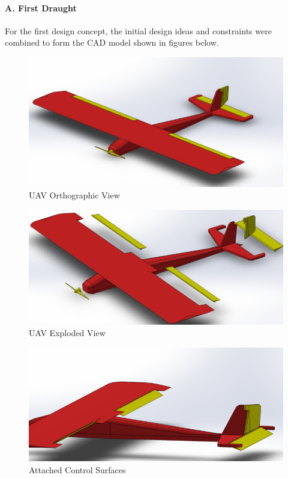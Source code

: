 \documentclass[12pt]{article}
\begin{document}
\paragraph{A. First Draught} For the first design concept, the initial design ideas and constraints were combined to form the CAD model shown in figures below. \\

\begin{figure}
\includegraphics[width=15cm]{allplane.png}
\caption{UAV Orthographic View}
\end{figure}

\begin{figure}
    \includegraphics[width=15cm]{allplanedes.png}
    \caption{UAV Exploded View}
\end{figure}


\begin{figure}[h!]
    \includegraphics[width=14.5cm]{control.png}
    \caption{Attached Control Surfaces}
\end{figure}
\end{document}
